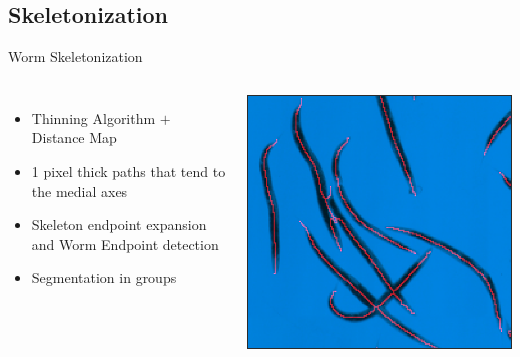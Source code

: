 \documentclass[xcolor=table]{beamer}
\begin{document}
\subsection{Skeletonization}
\begin{frame}{Worm Skeletonization}

\begin{columns}[c]
\column{2.4in}
\begin{itemize}
\item Thinning Algorithm $+$ Distance Map \pause
\item 1 pixel thick paths that tend to the medial axes \pause
\item Skeleton endpoint expansion and Worm Endpoint detection \pause
\item Segmentation in groups
\end{itemize}
\column{2in}
\includegraphics[scale=0.3]{skeleton1}

\end{columns}

\end{frame}


\end{document}
